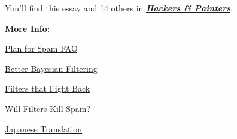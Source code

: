                   

                  
                    
                      
                        
                          You'll find this essay and 14 others in
                          \href{http://www.amazon.com/gp/product/0596006624}{\textbf{\emph{Hackers \& Painters}}}.
                        

                      
                    

                    
                  
                  


                  \textbf{More Info:}


              
            
          

            
              
            
            
              
                \href{http://www.paulgraham.com/spamfaq.html}{Plan for Spam FAQ}

              
              
              
                \href{http://paulgraham.com/better.html}{Better Bayesian Filtering}

              
            
            
              
            
            
              
            
            
              
                \href{http://www.paulgraham.com/ffb.html}{Filters that Fight Back}

              
              
              
                \href{http://www.paulgraham.com/wfks.html}{Will Filters Kill Spam?}

              
            
            
              
            
            
              
            
            
              
                \href{http://www.shiro.dreamhost.com/scheme/trans/spam-j.html}{Japanese Translation}

              
              
